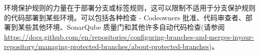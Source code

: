 环境保护规则的力量在于部署分支或标签规则，这可以限制不适用于分支保护规则的代码部署到某些环境。可以包括各种检查 - Codeowners 批准、代码审查者、部署到某些其他环境、SonarQube 质量门和其他许多自动代码检查(请参阅\url{https://docs.github.com/en/repositories/configuring-branches-and-merges-inyour-repository/managing-protected-branches/about-protected-branches})。

























